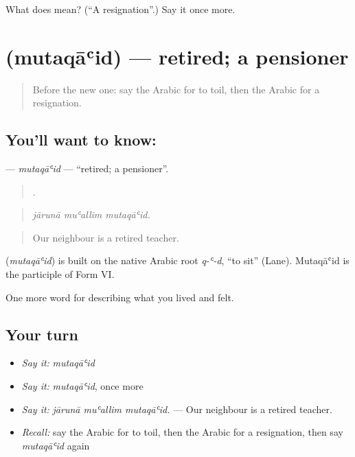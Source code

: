 \begin{tcolorbox}[breakable,colback=teal!4,colframe=teal!35!black,title={Before you move on}]
What does  mean? (\textquotedblleft{}A resignation\textquotedblright{}.) Say it once more.
\end{tcolorbox}
\section[\texorpdfstring{\ar{متقاعد} (mutaqāʿid)}{متقاعد (mutaqāʿid)}]{ (mutaqāʿid) — retired; a pensioner}

\label{lesson:AR-C522-mutaqaid}



\begin{quote}
Before the new one: say the Arabic for to toil, then the Arabic for a resignation.
\end{quote}

\subsection*{You'll want to know: }
\textbf{} — \emph{mutaqāʿid} — \textquotedblleft{}retired; a pensioner\textquotedblright{}.

\begin{quote}
  .
\end{quote}

\begin{quote}
\emph{jārunā muʿallim mutaqāʿid.}
\end{quote}

\begin{quote}
Our neighbour is a retired teacher.
\end{quote}

\begin{cousinweb}
\textbf{} (\emph{mutaqāʿid}) is built on the native Arabic root \emph{q-ʿ-d}, \textquotedblleft{}to sit\textquotedblright{} (Lane). Mutaqāʿid is the participle of Form VI.
\end{cousinweb}

\begin{grammarlens}[title={What you've built}]
One more word for describing what you lived and felt.
\end{grammarlens}

\subsection*{Your turn}
\begin{itemize}
\raggedright
  \item \emph{Say it:} \emph{mutaqāʿid}
  \item \emph{Say it:} \emph{mutaqāʿid}, once more
  \item \emph{Say it:} \emph{jārunā muʿallim mutaqāʿid.} — Our neighbour is a retired teacher.
  \item \emph{Recall:} say the Arabic for to toil, then the Arabic for a resignation, then say \emph{mutaqāʿid} again
\end{itemize}


